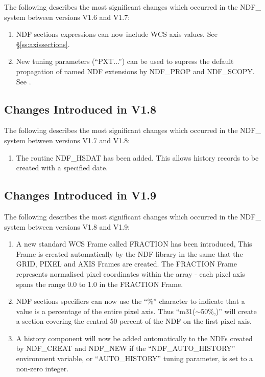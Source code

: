 \documentclass[twoside,11pt,nolof]{starlink}
\begin{document}
The following describes the most significant changes which occurred in
the NDF\_ system between versions V1.6 and V1.7:

\begin{enumerate}
\item NDF sections expressions can now include WCS axis values.
See \S\ref{ss:axissections}.

\item New tuning parameters (``PXT...'') can be used to supress the default
propagation of named NDF extensions by NDF\_PROP and NDF\_SCOPY. See
.

\end{enumerate}

\subsection{Changes Introduced in V1.8}

The following describes the most significant changes which occurred in
the NDF\_ system between versions V1.7 and V1.8:

\begin{enumerate}
\item The routine NDF\_HSDAT has been added. This allows history records
to be created with a specified date.

\end{enumerate}

\subsection{Changes Introduced in V1.9}

The following describes the most significant changes which occurred in
the NDF\_ system between versions V1.8 and V1.9:

\begin{enumerate}

   \item A new standard WCS Frame called FRACTION has been introduced,
   This Frame is created automatically by the NDF library in the same
   that the GRID, PIXEL and AXIS Frames are created. The FRACTION Frame
   represents normalised pixel coordinates within the array - each pixel
   axis spans the range 0.0 to 1.0 in the FRACTION Frame.

   \item NDF sections specifiers can now use the ``\%'' character to indicate
   that a value is a percentage of the entire pixel axis. Thus ``m31($\sim$50\%,)''
   will create a section covering the central 50 percent of the NDF on
   the first pixel axis.

   \item A history component will now be added automatically to the NDFs
   created by NDF\_CREAT and NDF\_NEW if the ``NDF\_AUTO\_HISTORY'' environment
   variable, or ``AUTO\_HISTORY'' tuning parameter, is set to a non-zero
   integer.

\end{enumerate}
\end{document}
